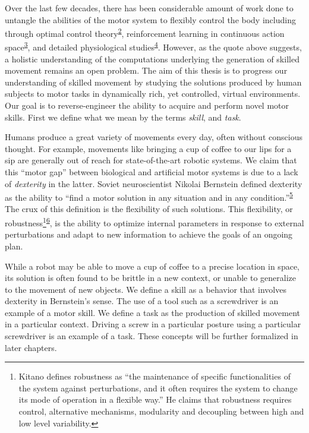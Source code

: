 \documentclass[
  a4paper,
]{article}
\begin{document}
Over the last few decades, there has been considerable amount of work
done to untangle the abilities of the motor system to flexibly control
the body including through optimal control
theory\textsuperscript{\protect\hyperlink{ref-Todorov2004}{2}},
reinforcement learning in continuous action
space\textsuperscript{\protect\hyperlink{ref-koberReinforcementLearningRobotics2013}{3}},
and detailed physiological
studies\textsuperscript{\protect\hyperlink{ref-sauerbreiCorticalPatternGeneration2019}{4}}.
However, as the quote above suggests, a holistic understanding of the
computations underlying the generation of skilled movement remains an
open problem. The aim of this thesis is to progress our understanding of
skilled movement by studying the solutions produced by human subjects to
motor tasks in dynamically rich, yet controlled, virtual environments.
Our goal is to reverse-engineer the ability to acquire and perform novel
motor skills. First we define what we mean by the terms \emph{skill},
and \emph{task}.

Humans produce a great variety of movements every day, often without
conscious thought. For example, movements like bringing a cup of coffee
to our lips for a sip are generally out of reach for state-of-the-art
robotic systems. We claim that this ``motor gap'' between biological and
artificial motor systems is due to a lack of \emph{dexterity} in the
latter. Soviet neuroscientist Nikolai Bernstein defined dexterity as the
ability to ``find a motor solution in any situation and in any
condition.''\textsuperscript{\protect\hyperlink{ref-Bernstein1967}{5}}
The crux of this definition is the flexibility of such solutions. This
flexibility, or
robustness\footnote{Kitano defines robustness as ``the maintenance of
  specific functionalities of the system against perturbations, and it
  often requires the system to change its mode of operation in a
  flexible way.'' He claims that robustness requires control,
  alternative mechanisms, modularity and decoupling between high and low
  level variability.}\textsuperscript{\protect\hyperlink{ref-kitanoBiologicalRobustness2004}{6}},
is the ability to optimize internal parameters in response to external
perturbations and adapt to new information to achieve the goals of an
ongoing plan.

While a robot may be able to move a cup of coffee to a precise location
in space, its solution is often found to be brittle in a new context, or
unable to generalize to the movement of new objects. We define a skill
as a behavior that involves dexterity in Bernstein's sense. The use of a
tool such as a screwdriver is an example of a motor skill. We define a
task as the production of skilled movement in a particular context.
Driving a screw in a particular posture using a particular screwdriver
is an example of a task. These concepts will be further formalized in
later chapters.
\end{document}
